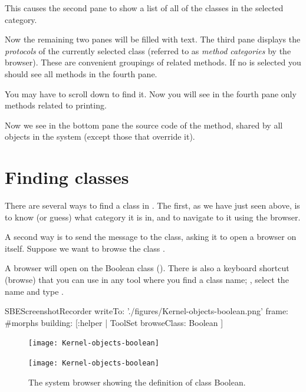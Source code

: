 \documentclass[a4paper,10pt,twoside]{book}
\begin{document}
This causes the second pane to show a list of all of the classes in the selected category.

Now the remaining two panes will be filled with text.
The third pane displays the \emph{protocols} of the currently selected class (referred to as \emph{method categories} by the browser).
These are convenient groupings of related methods.
If no  is selected you should see all methods in the fourth pane.

You may have to scroll down to find it.
Now you will see in the fourth pane only methods related to printing.

Now we see in the bottom pane the source code of the  method, shared by all objects in the system (except those that override it).

\section{Finding classes}

There are several ways to find a class in \sq.
The first, as we have just seen above, is to know (or guess) what category it is in, and to navigate to it using the browser.

A second way is to send the  message to the class, asking it to open a browser on itself.
Suppose we want to browse the class .

A browser will open on the Boolean class ().
There is also a keyboard shortcut  (browse) that you can use in any tool where you find a class name; , select the name and type .


\begin{ExecuteSmalltalkScript}
SBEScreenshotRecorder writeTo: './figures/Kernel-objects-boolean.png' frame: #morphs building: [:helper |
	ToolSet browseClass:  Boolean
]
\end{ExecuteSmalltalkScript}
\begin{figure}[hbt]
\ifluluelse
	{\centerline {\texttt{[image: Kernel-objects-boolean]}}}
	{\centerline {\texttt{[image: Kernel-objects-boolean]}}}
\caption{The system browser showing the definition of class Boolean.
\label{fig:browseBoolean}}
\end{figure}
\end{document}
